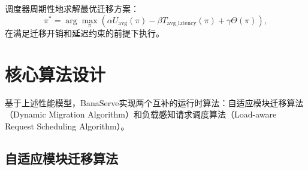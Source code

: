 调度器周期性地求解最优迁移方案：
\begin{equation}
    \pi^* = \arg\max_\pi \left(\alpha U_{\text{avg}}(\pi) - \beta T_{\text{avg\_latency}}(\pi) + \gamma \Theta(\pi)\right)
    \label{eq:optimal_plan},
\end{equation}
在满足迁移开销和延迟约束的前提下执行。

\section{核心算法设计}
\label{sec:bana_algo}

基于上述性能模型，BanaServe实现两个互补的运行时算法：自适应模块迁移算法（Dynamic Migration Algorithm）和负载感知请求调度算法（Load-aware Request Scheduling Algorithm）。

\subsection{自适应模块迁移算法}


